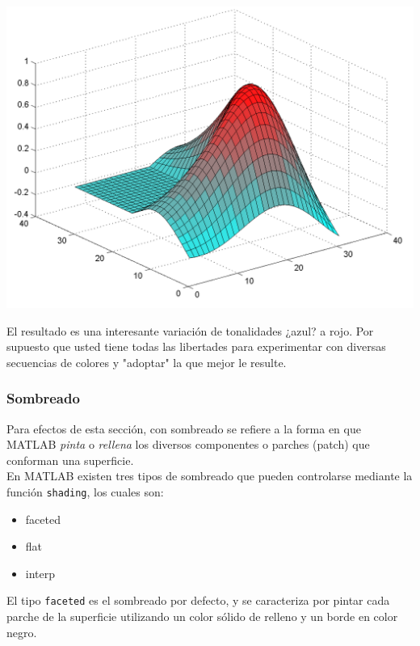 \begin{center}
\includegraphics[scale=0.6]{src/ch4/img_4_11.png}
\end{center}

El resultado es una interesante variación de tonalidades ¿azul? a rojo. Por supuesto 
que  usted tiene todas las libertades para experimentar con diversas secuencias de 
colores y "adoptar" la que mejor le resulte.

\subsubsection{Sombreado}

Para efectos de esta sección, con sombreado se refiere a la forma en que MATLAB 
\textit{pinta} o \textit{rellena} los diversos componentes o parches (patch) que 
conforman una superficie.\\

En MATLAB existen tres tipos de sombreado que pueden controlarse mediante la función 
\texttt{shading}, los cuales son:

\begin{itemize}
\item faceted
\item flat
\item interp
\end{itemize}

El tipo \texttt{faceted} es el sombreado por defecto, y se caracteriza por pintar cada 
parche de la superficie utilizando un color sólido de relleno y un borde en color negro.\\

